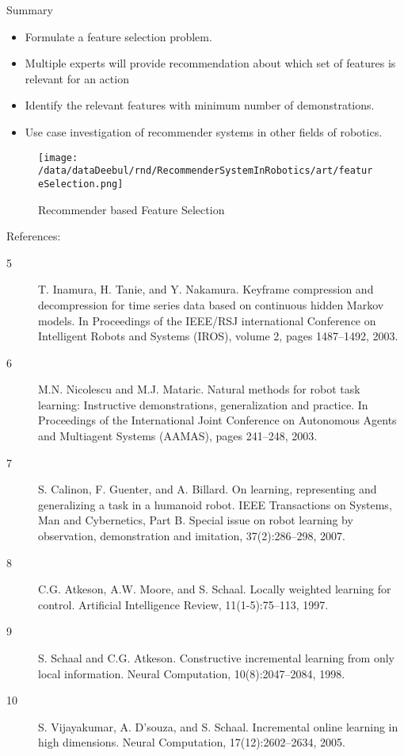 \documentclass[mathserif,serif]{beamer}
\begin{document}
 \begin{frame}{Summary}
    \begin{itemize}
	\item Formulate a feature selection problem.
	\item Multiple experts will provide recommendation about which  set of features is relevant for an action 
	\item Identify the relevant features with minimum number of demonstrations.
	\item Use case investigation of recommender systems in other fields of robotics.
	
\end{itemize}
\begin{figure}[htp]
\centering
\texttt{[image: /data/dataDeebul/rnd/RecommenderSystemInRobotics/art/featureSelection.png]}
\caption{Recommender based Feature Selection}
\label{}
\end{figure}
\end{frame}
{}

\begin{frame}{References:}
\begin{description}
	\item[5] \tiny{T. Inamura, H. Tanie, and Y. Nakamura.
Keyframe compression and decompression for time
series data based on continuous hidden Markov
models. In Proceedings of the IEEE/RSJ international Conference on Intelligent Robots and Systems (IROS), volume 2, pages 1487–1492, 2003.}

	\item[6] M.N. Nicolescu and M.J. Mataric. Natural methods for robot task learning: Instructive demonstrations, generalization and practice. In Proceedings of the International Joint Conference on Autonomous Agents and Multiagent Systems (AAMAS), pages 241–248, 2003.

	\item[7] S. Calinon, F. Guenter, and A. Billard. On learning, representing and generalizing a task in a humanoid robot. IEEE Transactions on Systems,
Man and Cybernetics, Part B. Special issue on
robot learning by observation, demonstration and
imitation, 37(2):286–298, 2007.

	\item[8]  C.G. Atkeson, A.W. Moore, and S. Schaal. Locally
weighted learning for control. Artificial Intelligence
Review, 11(1-5):75–113, 1997.

	\item[9]  S. Schaal and C.G. Atkeson. Constructive incremental learning from only local information. Neural Computation, 10(8):2047–2084, 1998.

	\item[10] S. Vijayakumar, A. D’souza, and S. Schaal. Incremental online learning in high dimensions. Neural
Computation, 17(12):2602–2634, 2005.

\end{description}
\end{frame}
\end{document}
